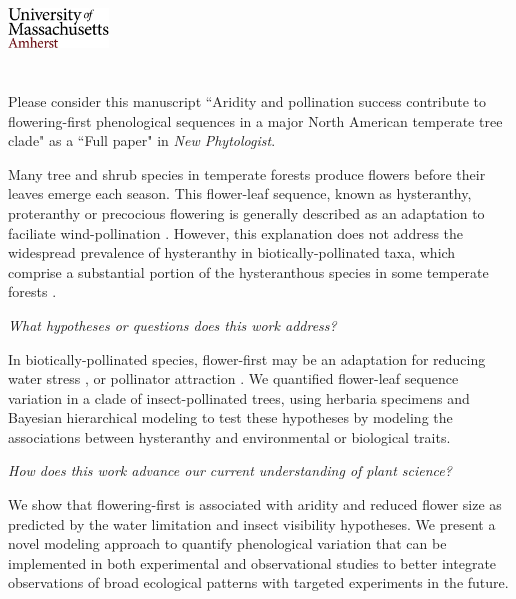 \documentclass{article}[12pt]
\begin{document}

\noindent\includegraphics[width=0.2\textwidth]{umasslogo}\\\\

\\


\noindent Please consider this manuscript ``Aridity and pollination success contribute to flowering-first phenological sequences in a major North American temperate tree clade" as a ``Full paper" in \textit{New Phytologist}.

\noindent Many tree and shrub species in temperate forests produce flowers before their leaves emerge each season. This flower-leaf sequence, known as hysteranthy, proteranthy or precocious flowering is generally described as an adaptation to faciliate wind-pollination \citep{Rathcke_1985}. However, this explanation does not address the widespread prevalence of hysteranthy in biotically-pollinated taxa, which comprise a substantial portion of the hysteranthous species in some temperate forests \citep{Buonaiuto2020}. 

\noindent \emph{What hypotheses or questions does this work address?}

\noindent In biotically-pollinated species, flower-first may be an adaptation for reducing water stress \citep[\textbf{Water limitation hypothesis};][]{Gougherty2018,Buonaiuto2020}, or pollinator attraction \citep[\textbf{Insect visibility hypothesis};][]{Janzen1967}. We quantified flower-leaf sequence variation in a clade of insect-pollinated trees, using herbaria specimens and Bayesian hierarchical modeling to test these hypotheses by modeling the associations between hysteranthy and environmental or biological traits.

\noindent \emph{How does this work advance our current understanding of plant science?}

\noindent We show that flowering-first is associated with aridity and reduced flower size as predicted by the water limitation and insect visibility hypotheses. We present a novel modeling approach to quantify phenological variation that can be implemented in both experimental and observational studies to better integrate observations of broad ecological patterns with targeted experiments in the future.
\end{document}

